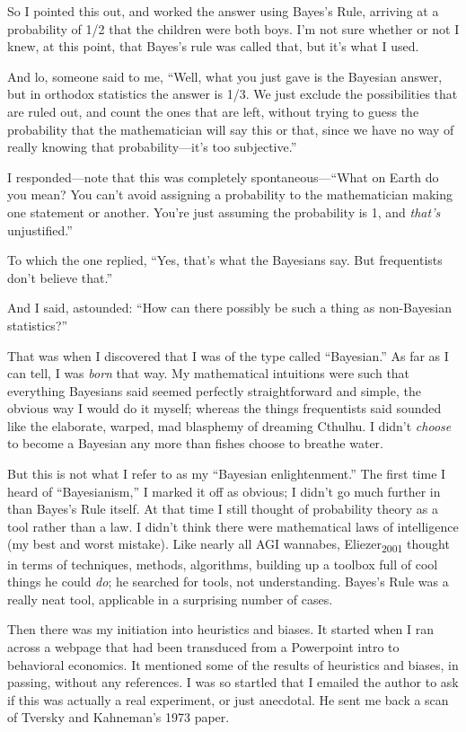 {
 So I pointed this out, and worked the answer using
Bayes's Rule, arriving at a probability of 1/2 that the
children were both boys. I'm not sure whether or not I
knew, at this point, that Bayes's rule was called that,
but it's what I used.}

{
 And lo, someone said to me, ``Well, what you just
gave is the Bayesian answer, but in orthodox statistics the answer is
1/3. We just exclude the possibilities that are ruled out, and count
the ones that are left, without trying to guess the probability that
the mathematician will say this or that, since we have no way of really
knowing that probability---it's too
subjective.''}

{
 I responded---note that this was completely
spontaneous---``What on Earth do you mean? You
can't avoid assigning a probability to the
mathematician making one statement or another. You're
just assuming the probability is 1, and \textit{that's}
unjustified.''}

{
 To which the one replied, ``Yes,
that's what the Bayesians say. But frequentists
don't believe that.''}

{
 And I said, astounded: ``How can there possibly
be such a thing as non-Bayesian statistics?''}

{
 That was when I discovered that I was of the type called
``Bayesian.'' As far as I can tell,
I was \textit{born} that way. My mathematical intuitions were such that
everything Bayesians said seemed perfectly straightforward and simple,
the obvious way I would do it myself; whereas the things frequentists
said sounded like the elaborate, warped, mad blasphemy of dreaming
Cthulhu. I didn't \textit{choose} to become a Bayesian
any more than fishes choose to breathe water.}

{
 But this is not what I refer to as my ``Bayesian
enlightenment.'' The first time I heard of
``Bayesianism,'' I marked it off as
obvious; I didn't go much further in than
Bayes's Rule itself. At that time I still thought of
probability theory as a tool rather than a law. I
didn't think there were mathematical laws of
intelligence (my best and worst mistake). Like nearly all AGI wannabes,
Eliezer\textsubscript{2001} thought in terms of techniques, methods,
algorithms, building up a toolbox full of cool things he could
\textit{do}; he searched for tools, not understanding.
Bayes's Rule was a really neat tool, applicable in a
surprising number of cases.}

{
 Then there was my initiation into heuristics and biases. It
started when I ran across a webpage that had been transduced from a
Powerpoint intro to behavioral economics. It mentioned some of the
results of heuristics and biases, in passing, without any references. I
was so startled that I emailed the author to ask if this was actually a
real experiment, or just anecdotal. He sent me back a scan of Tversky
and Kahneman's 1973 paper.}

